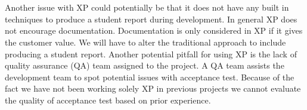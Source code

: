 \\\\
Another issue with XP could potentially be that it does not have any built in techniques to produce a student report during development. In general XP does not encourage documentation. Documentation is only considered in XP if it gives the customer value. We will have to alter the traditional approach to include producing a student report. Another potential pitfall for using XP is the lack of quality assurance (QA) team assigned to the project. A QA team assists the development team to spot potential issues with acceptance test. Because of the fact we have not been working solely XP in previous projects we cannot evaluate the quality of acceptance test based on prior experience.

